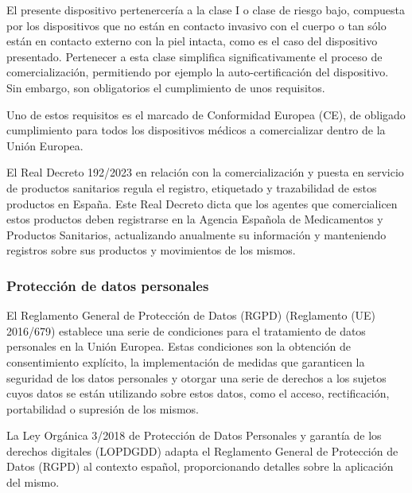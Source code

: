 El presente dispositivo pertenercería a la clase I o clase de riesgo bajo, compuesta por los dispositivos que no están en contacto invasivo con el cuerpo o tan sólo están en contacto externo con la piel intacta, como es el caso del dispositivo presentado. Pertenecer a esta clase simplifica significativamente el proceso de comercialización, permitiendo por ejemplo la auto-certificación del dispositivo. Sin embargo, son obligatorios el cumplimiento de unos requisitos.

Uno de estos requisitos es el marcado de Conformidad Europea (CE), de obligado cumplimiento para todos los dispositivos médicos a comercializar dentro de la Unión Europea.

El Real Decreto 192/2023 \cite{BOE-A-2023-7416} en relación con la comercialización y puesta en servicio de productos sanitarios regula el registro, etiquetado y trazabilidad de estos productos en España. Este Real Decreto dicta que los agentes que comercialicen estos productos deben registrarse en la Agencia Española de Medicamentos y Productos Sanitarios, actualizando anualmente su información y manteniendo registros sobre sus productos y movimientos de los mismos.
\subsubsection{Protección de datos personales}
El Reglamento General de Protección de Datos (RGPD) (Reglamento (UE) 2016/679) \cite{reglamento-ue-2016-679} establece una serie de condiciones para el tratamiento de datos personales en la Unión Europea. Estas condiciones son la obtención de consentimiento explícito, la implementación de medidas que garanticen la seguridad de los datos personales y otorgar una serie de derechos a los sujetos cuyos datos se están utilizando sobre estos datos, como el acceso, rectificación, portabilidad o supresión de los mismos.

La Ley Orgánica 3/2018 de Protección de Datos Personales y garantía de los derechos digitales (LOPDGDD) \cite{ley-organica-3-2018} adapta el Reglamento General de Protección de Datos (RGPD) al contexto español, proporcionando detalles sobre la aplicación del mismo.